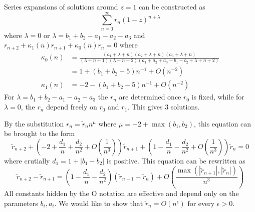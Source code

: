 \documentclass[12pt]{article}
\numberwithin{equation}{section}
\begin{document}
Series expansions of solutions around $z=1$ can be constructed as
\begin{equation*}
\sum_{n=0}^{\infty} r_n (1-z)^{n+\lambda}
\end{equation*}
where $\lambda =0$ or $\lambda = b_1+b_2-a_1-a_2-a_3$ and $r_{n+2} + \kappa_1(n) r_{n+1} + \kappa_0(n) r_n = 0$ where
\begin{align*}
\kappa_0(n) &= \frac{\left(a_1+\lambda +n\right) \left(a_2+\lambda
   +n\right) \left(a_3+\lambda +n\right)}{(\lambda +n+1)
   (\lambda +n+2) \left(a_1+a_2+a_3-b_1-b_2+\lambda
   +n+2\right)}\\
&=1 + \left(b_1+b_2-5 \right) n^{-1} + O(n^{-2})\\
\kappa_1(n) &=-2 - \left(b_1+b_2-5 \right) n^{-1} + O(n^{-2})
\end{align*}
For $\lambda = b_1+b_2-a_1-a_2-a_3$ the $r_n$ are determined once $r_0$ is fixed, while for $\lambda = 0$, the $r_n$ depend freely on $r_0$ and $r_1$. This gives $3$ solutions.

By the substitution $r_n = \tilde{r}_n n^\mu$ where $\mu = -2 + \operatorname{max}(b_1,b_2)$, this equation can be brought to the form
\begin{equation*}
\tilde{r}_{n+2} + \left(-2 + \frac{d_1}{n} + \frac{d_2}{n^2} + O(\frac{1}{n^3}) \right) \tilde{r}_{n+1} + \left(1 - \frac{d_1}{n} - \frac{d_2}{n^2} + O(\frac{1}{n^3}) \right) \tilde{r}_{n} = 0
\end{equation*}
where crutially $d_1 = 1 + |b_1-b_2|$ is positive. This equation can be rewritten as
\begin{equation*}
\tilde{r}_{n+2} - \tilde{r}_{n+1} = \left(1 - \frac{d_1}{n} - \frac{d_2}{n^2} \right) (\tilde{r}_{n+1} - \tilde{r}_{n}) + O(\frac{\operatorname{max}(|\tilde{r}_{n+1}|, |\tilde{r}_{n}|)}{n^3})
\end{equation*}
All constants hidden by the O notation are effective and depend only on the parameters $b_i,a_i$. We would like to show that $\tilde{r}_{n} = O(n^{\epsilon})$ for every $\epsilon > 0$.
\end{document}
